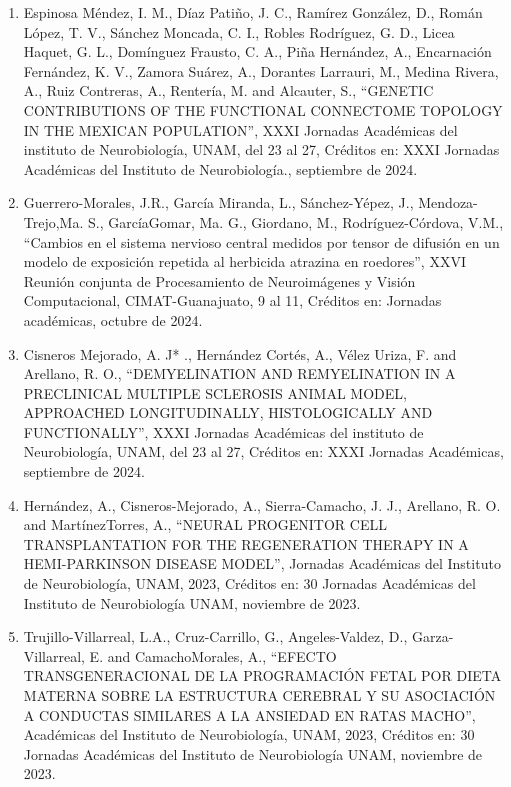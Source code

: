 \begin{enumerate}
\item  Espinosa Méndez, I. M., Díaz Patiño, J. C., Ramírez González, D., Román López, T. V., Sánchez Moncada, C. I., Robles 
Rodríguez, G. D., Licea Haquet, G. L., Domínguez Frausto, C. A., Piña Hernández, A., Encarnación Fernández, K. V., Zamora 
Suárez, A., Dorantes Larrauri, M., Medina Rivera, A., Ruiz Contreras, A., Rentería, M. and Alcauter, S., “GENETIC 
CONTRIBUTIONS OF THE FUNCTIONAL CONNECTOME TOPOLOGY IN THE MEXICAN POPULATION”, XXXI Jornadas Académicas del instituto de 
Neurobiología, UNAM, del 23 al 27, Créditos en: XXXI Jornadas Académicas del Instituto de Neurobiología., septiembre de 2024.

\item  Guerrero-Morales, J.R., García Miranda, L., Sánchez-Yépez, J., Mendoza-Trejo,Ma. S., GarcíaGomar, Ma. G., Giordano, 
M., 
Rodríguez-Córdova, V.M., “Cambios en el sistema nervioso central medidos por tensor de difusión en un modelo de exposición 
repetida al herbicida atrazina en roedores”, XXVI Reunión conjunta de Procesamiento de Neuroimágenes y Visión Computacional, 
CIMAT-Guanajuato, 9 al 11, Créditos en: Jornadas académicas, octubre de 2024.

\item  Cisneros Mejorado, A. J* ., Hernández Cortés, A., Vélez Uriza, F. and Arellano, R. O., “DEMYELINATION AND 
REMYELINATION 
IN A PRECLINICAL MULTIPLE SCLEROSIS ANIMAL MODEL, APPROACHED LONGITUDINALLY, HISTOLOGICALLY AND FUNCTIONALLY”, XXXI Jornadas 
Académicas del instituto de Neurobiología, UNAM, del 23 al 27, Créditos en: XXXI
Jornadas Académicas, septiembre de 2024.

\item  Hernández, A., Cisneros-Mejorado, A., Sierra-Camacho, J. J., Arellano, R. O. and MartínezTorres, A., “NEURAL 
PROGENITOR 
CELL TRANSPLANTATION FOR THE REGENERATION THERAPY IN A HEMI-PARKINSON DISEASE MODEL”, Jornadas Académicas del Instituto de 
Neurobiología, UNAM, 2023, Créditos en: 30 Jornadas Académicas del Instituto de Neurobiología UNAM, noviembre de 2023.

\item  Trujillo-Villarreal, L.A., Cruz-Carrillo, G., Angeles-Valdez, D., Garza-Villarreal, E. and CamachoMorales, A., “EFECTO 
TRANSGENERACIONAL DE LA PROGRAMACIÓN FETAL POR DIETA MATERNA SOBRE LA ESTRUCTURA CEREBRAL Y SU ASOCIACIÓN A CONDUCTAS 
SIMILARES A LA ANSIEDAD EN RATAS MACHO”, Académicas del Instituto de Neurobiología, UNAM, 2023, Créditos en: 30 Jornadas 
Académicas del Instituto de Neurobiología UNAM, noviembre de 2023.


\end{enumerate}
